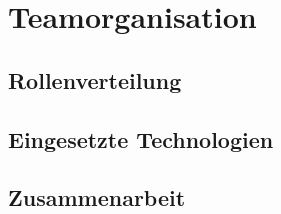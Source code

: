 
\chapter{Teamorganisation}

\section{Rollenverteilung}

\section{Eingesetzte Technologien}

\section{Zusammenarbeit}
